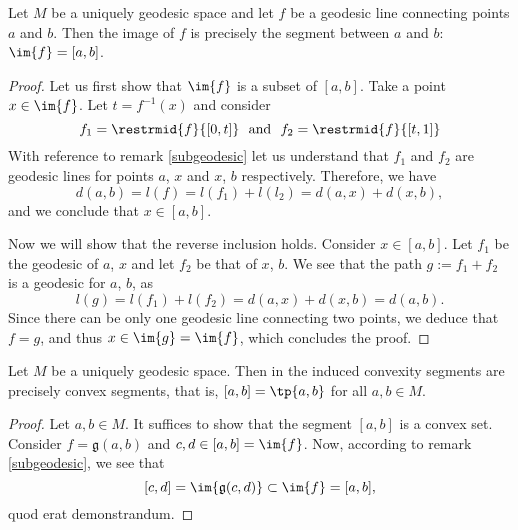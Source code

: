 \documentclass[12pt, a4paper]{article}
\newcommand{\g}{\mathfrak{g}}
\begin{document}
\begin{lemma}\label{unigeo-1}
    Let \(M\) be a uniquely geodesic space and let \(f\) be a geodesic line connecting points \(a\) and \(b\). Then the image of \(f\) is precisely the segment between \(a\) and \(b\): \(\im{f} = [a, b]\).
\end{lemma}
\begin{proof}
    Let us first show that \(\im{f}\) is a subset of \([a, b]\). Take a point \(x \in \im{f}\). Let \(t = f^{-1}(x)\) and consider \[f_1 = \restrmid{f}{[0, t]} \ \mbox{    and    } \ f_2 = \restrmid{f}{[t, 1]}\] With reference to remark \ref{subgeodesic} let us understand that \(f_1\) and \(f_2\) are geodesic lines for points \(a\), \(x\) and \(x\), \(b\) respectively. Therefore, we have \[d(a, b) = l(f) = l(f_1) + l(l_2) = d(a, x) + d(x, b),\] and we conclude that \(x \in [a, b]\).

    Now we will show that the reverse inclusion holds. Consider \(x \in [a, b]\). Let \(f_1\) be the geodesic of \(a\), \(x\) and let \(f_2\) be that of \(x\), \(b\). We see that the path \(g := f_1+f_2\) is a geodesic for \(a\), \(b\), as \[l(g) = l(f_1) + l(f_2) = d(a, x) + d(x, b) = d(a, b).\] Since there can be only one geodesic line connecting two points, we deduce that \(f = g\), and thus \(x \in \im{g} = \im{f}\), which concludes the proof.
\end{proof}

\begin{lemma}\label{unigeo-2}
    Let \(M\) be a uniquely geodesic space. Then in the induced convexity segments are precisely convex segments, that is, \([a, b] = \tp{a, b}\) for all \(a, b \in M\).
\end{lemma}
\begin{proof}
    Let \(a, b \in M\). It suffices to show that the segment \([a, b]\) is a convex set. Consider \(f = \g(a,b)\) and \(c, d \in [a, b] = \im{f}\). Now, according to remark \ref{subgeodesic}, we see that \[[c, d] = \im{\g(c, d)} \subset \im{f} = [a, b],\] quod erat demonstrandum.
\end{proof}
\end{document}

